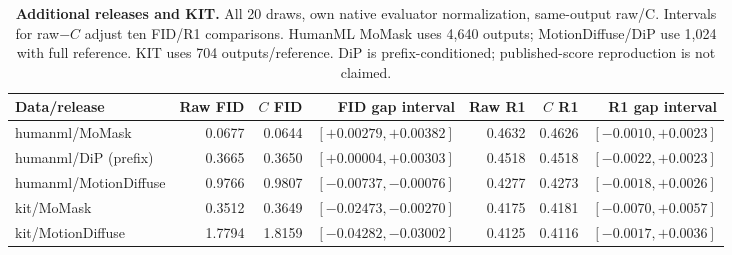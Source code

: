 \begin{table}[t]
\centering\footnotesize
\caption{\textbf{Additional releases and KIT.} All 20 draws, own native evaluator normalization, same-output raw/C. Intervals for raw$-C$ adjust ten FID/R1 comparisons. HumanML MoMask uses 4,640 outputs; MotionDiffuse/DiP use 1,024 with full reference. KIT uses 704 outputs/reference. DiP is prefix-conditioned; published-score reproduction is not claimed.}\label{tab:additionalfull}
\begin{tabular}{@{}lrrrrrr@{}}\toprule
Data/release&Raw FID&$C$ FID&FID gap interval&Raw R1&$C$ R1&R1 gap interval\\\midrule
humanml/MoMask&0.0677&0.0644&$[+0.00279,+0.00382]$&0.4632&0.4626&$[-0.0010,+0.0023]$\\
humanml/DiP (prefix)&0.3665&0.3650&$[+0.00004,+0.00303]$&0.4518&0.4518&$[-0.0022,+0.0023]$\\
humanml/MotionDiffuse&0.9766&0.9807&$[-0.00737,-0.00076]$&0.4277&0.4273&$[-0.0018,+0.0026]$\\
kit/MoMask&0.3512&0.3649&$[-0.02473,-0.00270]$&0.4175&0.4181&$[-0.0070,+0.0057]$\\
kit/MotionDiffuse&1.7794&1.8159&$[-0.04282,-0.03002]$&0.4125&0.4116&$[-0.0017,+0.0036]$\\
\bottomrule\end{tabular}\end{table}
